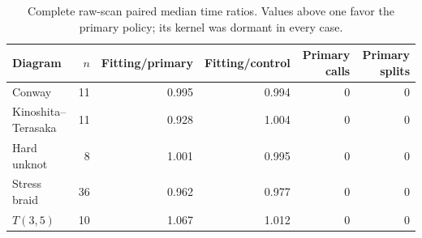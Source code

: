 \begin{table}[!htbp]
\centering\small
\setlength{\tabcolsep}{4pt}
\caption{Complete raw-scan paired median time ratios. Values above one favor the primary policy; its kernel was dormant in every case.}
\label{tab:natural}
\begin{tabular}{lrrrrr}
\toprule
Diagram & $n$ & Fitting/primary & Fitting/control & Primary calls & Primary splits\\
\midrule
Conway & 11 & 0.995 & 0.994 & 0 & 0\\
Kinoshita--Terasaka & 11 & 0.928 & 1.004 & 0 & 0\\
Hard unknot & 8 & 1.001 & 0.995 & 0 & 0\\
Stress braid & 36 & 0.962 & 0.977 & 0 & 0\\
$T(3,5)$ & 10 & 1.067 & 1.012 & 0 & 0\\
\bottomrule
\end{tabular}
\end{table}
